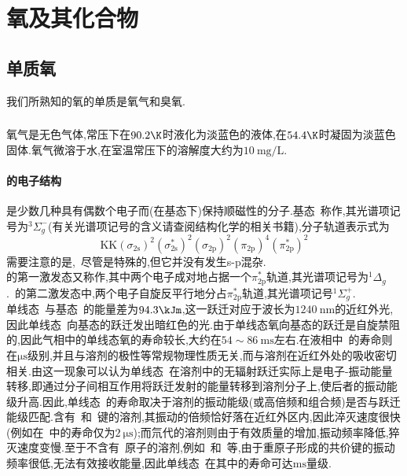 \documentclass{ctexbook}
\begin{document}
\section{氧及其化合物}
\subsection{单质氧}
我们所熟知的氧的单质是氧气和臭氧.
\subsubsection{}
氧气是无色气体,常压下在$90.2\K$时液化为淡蓝色的液体,在$54.4\K$时凝固为淡蓝色固体.氧气微溶于水,在室温常压下的溶解度大约为$\SI{10}{\milli\gram\per\liter}$.
\paragraph{的电子结构}
是少数几种具有偶数个电子而(在基态下)保持顺磁性的分子.基态~称作,其光谱项记号为$^3\Sigma_g^{-}$(有关光谱项记号的含义请查阅结构化学的相关书籍),分子轨道表示式为
\[\text{KK}\left(\sigma_{2\text{s}}\right)^2\left(\sigma_{2\text{s}}^\ast\right)^2\left(\sigma_{2\text{p}}\right)^2\left(\pi_{2\text{p}}\right)^4\left(\pi_{2\text{p}}^\ast\right)^2\]
需要注意的是,~尽管是特殊的,但它并没有发生s-p混杂.\\
\indent {}的第一激发态又称作,其中两个电子成对地占据一个$\pi_{2\text{p}}^\ast$轨道,其光谱项记号为$^1\Delta_g$.~的第二激发态中,两个电子自旋反平行地分占$\pi_{2\text{p}}^\ast$轨道,其光谱项记号$^1\Sigma_g^+$.\\
\indent 单线态~与基态~的能量差为$94.3\kJm$,这一跃迁对应于波长为$\SI{1240}{\nano\meter}$的近红外光,因此单线态~向基态的跃迁发出暗红色的光.由于单线态氧向基态的跃迁是自旋禁阻的,因此气相中的单线态氧的寿命较长,大约在$54\sim\SI{86}{\milli\second}$左右.在液相中~的寿命则在$\si{\micro\second}$级别,并且与溶剂的极性等常规物理性质无关,而与溶剂在近红外处的吸收密切相关\cite{Merkel1972}.由这一现象可以认为单线态~在溶剂中的无辐射跃迁实际上是电子-振动能量转移,即通过分子间相互作用将跃迁发射的能量转移到溶剂分子上,使后者的振动能级升高.因此,单线态~的寿命取决于溶剂的振动能级(或高倍频和组合频)是否与跃迁能级匹配.含有~和~键的溶剂,其振动的倍频恰好落在近红外区内,因此淬灭速度很快(例如在~中的寿命仅为$\SI{2}{\micro\second}$);而氘代的溶剂则由于有效质量的增加,振动频率降低,猝灭速度变慢.至于不含有~原子的溶剂,例如~和~等,由于重原子形成的共价键的振动频率很低,无法有效接收能量,因此单线态~在其中的寿命可达$\si{\milli\second}$量级.
\end{document}
